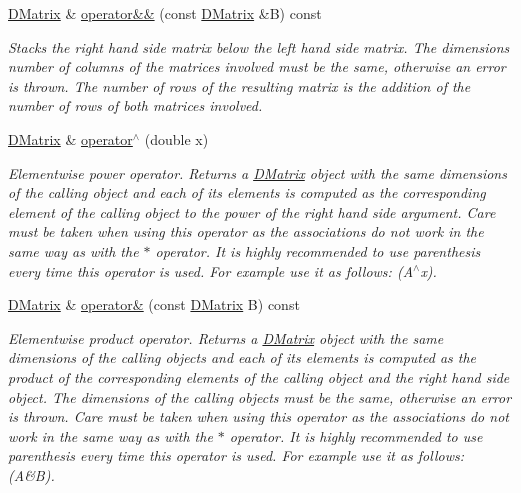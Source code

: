 \begin{DoxyCompactItemize}
\hyperlink{classDMatrix}{DMatrix} \& \hyperlink{classDMatrix_a0346b7c7d5952c7dbae995150ee40476}{operator\&\&} (const \hyperlink{classDMatrix}{DMatrix} \&B) const 
\begin{DoxyCompactList}\small\item\em Stacks the right hand side matrix below the left hand side matrix. The dimensions number of columns of the matrices involved must be the same, otherwise an error is thrown. The number of rows of the resulting matrix is the addition of the number of rows of both matrices involved. \item\end{DoxyCompactList}\item 
\hyperlink{classDMatrix}{DMatrix} \& \hyperlink{classDMatrix_af380c4e561b0f321b5bf7103038fa2cb}{operator$^\wedge$} (double x)
\begin{DoxyCompactList}\small\item\em Elementwise power operator. Returns a \hyperlink{classDMatrix}{DMatrix} object with the same dimensions of the calling object and each of its elements is computed as the corresponding element of the calling object to the power of the right hand side argument. Care must be taken when using this operator as the associations do not work in the same way as with the $\ast$ operator. It is highly recommended to use parenthesis every time this operator is used. For example use it as follows: (A$^\wedge$x). \item\end{DoxyCompactList}\item 
\hyperlink{classDMatrix}{DMatrix} \& \hyperlink{classDMatrix_a051fc52a9620318d04dd454d7970d319}{operator\&} (const \hyperlink{classDMatrix}{DMatrix} B) const 
\begin{DoxyCompactList}\small\item\em Elementwise product operator. Returns a \hyperlink{classDMatrix}{DMatrix} object with the same dimensions of the calling objects and each of its elements is computed as the product of the corresponding elements of the calling object and the right hand side object. The dimensions of the calling objects must be the same, otherwise an error is thrown. Care must be taken when using this operator as the associations do not work in the same way as with the $\ast$ operator. It is highly recommended to use parenthesis every time this operator is used. For example use it as follows: (A\&B). \item\end{DoxyCompactList}\item 

\end{DoxyCompactItemize}
